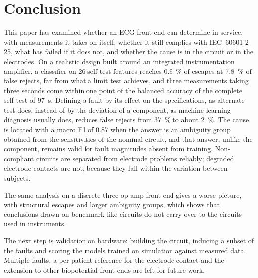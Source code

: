 \section{Conclusion}
\label{sec:conclusion}

This paper has examined whether an ECG front-end can determine in service, with measurements it
takes on itself, whether it still complies with IEC~60601-2-25, what has failed if it does not,
and whether the cause is in the circuit or in the electrodes. On a realistic design built around
an integrated instrumentation amplifier, a classifier on 26 self-test features reaches
\SI{0.9}{\percent} of escapes at \SI{7.8}{\percent} of false rejects, far from what a limit test
achieves, and three measurements taking three seconds come within one point of the balanced
accuracy of the complete self-test of \SI{97}{\second}. Defining a
fault by its effect on the specifications, as alternate test does, instead of by the deviation of
a component, as machine-learning diagnosis usually does, reduces false rejects from
\SI{37}{\percent} to about \SI{2}{\percent}. The cause is located with a macro F1 of 0.87 when
the answer is an ambiguity group obtained from the sensitivities of the nominal circuit, and that
answer, unlike the component, remains valid for fault magnitudes absent from training.
Non-compliant circuits are separated from electrode problems reliably; degraded electrode
contacts are not, because they fall within the variation between subjects.

The same analysis on a discrete three-op-amp front-end gives a worse picture, with structural
escapes and larger ambiguity groups, which shows that conclusions drawn on benchmark-like
circuits do not carry over to the circuits used in instruments.

The next step is validation on hardware: building the circuit, inducing a subset of the faults
and scoring the models trained on simulation against measured data. Multiple faults, a
per-patient reference for the electrode contact and the extension to other biopotential
front-ends are left for future work.
